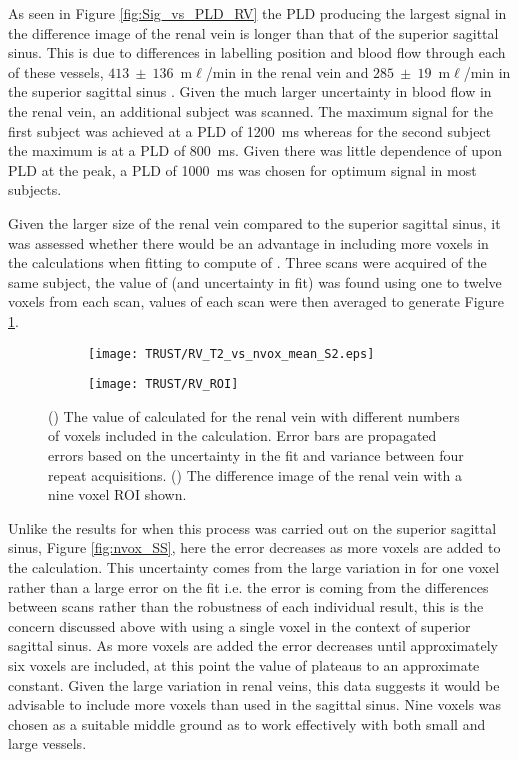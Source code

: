\newpage
As seen in Figure \ref{fig:Sig_vs_PLD_RV} the \ac{PLD} producing the largest signal in the difference image of the renal vein is longer than that of the superior sagittal sinus. This is due to differences in labelling position and blood flow through each of these vessels, $413~\pm~136$~m$\ell$/min in the renal vein \cite{cox_multiparametric_2017} and $285~\pm~19$~m$\ell$/min in the superior sagittal sinus \cite{jordan_velocity_1994}. Given the much larger uncertainty in blood flow in the renal vein, an additional subject was scanned. The maximum signal for the first subject was achieved at a \ac{PLD} of 1200~ms whereas for the second subject the maximum is at a \ac{PLD} of 800~ms. Given there was little dependence of \ttwo upon \ac{PLD} at the peak, a \ac{PLD} of 1000~ms was chosen for optimum signal in most subjects.

Given the larger size of the renal vein compared to the superior sagittal sinus, it was assessed whether there would be an advantage in including more voxels in the calculations when fitting to compute of \ttwo. Three scans were acquired of the same subject, the value of \ttwo (and uncertainty in fit) was found using one to twelve voxels from each scan, \ttwo values of each scan were then averaged to generate Figure \ref{fig:nvox_RV}.  

\begin{figure}[H]
	\centering
	\begin{subfigure}[c]{0.47\textwidth}
		\centering
		\texttt{[image: TRUST/RV\_T2\_vs\_nvox\_mean\_S2.eps]}
		\caption{}
		\label{fig:nvox_RV}
	\end{subfigure}
	\hfill
	\begin{subfigure}[c]{0.47\textwidth}
		\centering
		\texttt{[image: TRUST/RV\_ROI]}
		\caption{}
		\label{fig:RV_ROI}
	\end{subfigure}
	\caption{() The value of \ttwo calculated for the renal vein with different numbers of voxels included in the calculation. Error bars are propagated errors based on the uncertainty in the \ttwo fit and variance between four repeat acquisitions. () The difference image of the renal vein with a nine voxel \ac{ROI} shown.}
	\label{fig:nv_RV}
\end{figure}


Unlike the results for when this process was carried out on the superior sagittal sinus, Figure \ref{fig:nvox_SS}, here the error decreases as more voxels are added to the calculation. This uncertainty comes from the large variation in \ttwo for one voxel rather than a large error on the fit i.e. the error is coming from the differences between scans rather than the robustness of each individual result, this is the concern discussed above with using a single voxel in the context of superior sagittal sinus. As more voxels are added the error decreases until approximately six voxels are included, at this point the value of \ttwo plateaus to an approximate constant. Given the large variation in renal veins, this data suggests it would be advisable to include more voxels than used in the sagittal sinus. Nine voxels was chosen as a suitable middle ground as to work effectively with both small and large vessels.

